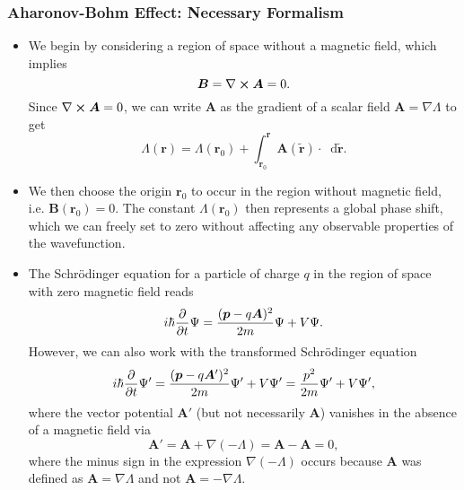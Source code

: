 \documentclass[11pt, a4paper]{article}
\newcommand{\diff}{\mathop{}\!\mathrm{d}} %
\renewcommand{\curl}{\nabla \cross}
\renewcommand{\grad}{\nabla}
\newcommand{\Schro}{Schr\"{o}dinger\xspace}
\renewcommand{\vec}[1]{\bm{#1}}  %
\renewcommand{\t}[1]{\tilde{#1}}
\renewcommand{\r}{\vec{r}}  %
\newcommand{\A}{\vec{A}}  %
\newcommand{\B}{\vec{B}}  %
\renewcommand{\P}{\Psi}  %
\begin{document}
\subsubsection{Aharonov-Bohm Effect: Necessary Formalism}
\begin{itemize}
	\item We begin by considering a region of space without a magnetic field, which implies
	\begin{equation*}
		\B = \curl \A = 0.
	\end{equation*} 
	Since $ \curl \A = 0 $, we can write $ \A $ as the gradient of a scalar field $ \A = \grad \Lambda $ to get
	\begin{equation*}
		\Lambda(\r) = \Lambda(\r_{0}) + \int_{\r_{0}}^{\r}\A(\t{\r})\cdot \diff \t{\r}.
	\end{equation*}
	
	\item We then choose the origin $ \r_{0} $ to occur in the region without magnetic field, i.e. $ \B(\r_{0}) = 0 $. The constant $ \Lambda(\r_{0}) $ then represents a global phase shift, which we can freely set to zero without affecting any observable properties of the wavefunction.

    \item The \Schro equation for a particle of charge $ q $ in the region of space with zero magnetic field reads
	\begin{equation*}
		i\hbar \pdv{t}\P = \frac{(\vec{p} - q \A)^{2}}{2m} \P + V\P.
	\end{equation*}
	However, we can also work with the transformed \Schro equation
	\begin{equation*}
		i\hbar \pdv{t}\P' = \frac{(\vec{p} - q \A')^{2}}{2m} \P' + V\P' = \frac{p^{2}}{2m}\P' + V\P',
	\end{equation*}
	where the vector potential $ \A' $ (but not necessarily $ \A $) vanishes in the absence of a magnetic field via
	\begin{equation*}
		\A' = \A + \grad(-\Lambda) = \A - \A = 0,
	\end{equation*}
    where the minus sign in the expression $ \grad(- \Lambda) $ occurs because $ \A $ was defined as $ \A = \grad \Lambda $ and not $ \A = - \grad \Lambda $.
	

\end{itemize}
\end{document}
